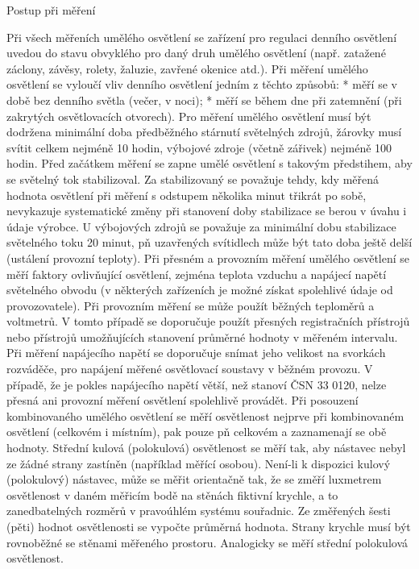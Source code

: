 \sec Postup při měření

Při všech měřeních umělého osvětlení se zařízení pro regulaci denního osvětlení uvedou do stavu obvyklého pro daný druh umělého osvětlení (např. zatažené záclony, závěsy, rolety, žaluzie, zavřené okenice atd.).
Při měření umělého osvětlení se vyloučí vliv denního osvětlení jedním z těchto způsobů:
\medskip
\begitems
    * měří se v době bez denního světla (večer, v noci);
    * měří se během dne při zatemnění (při zakrytých osvětlovacích otvorech).
\enditems
\medskip
Pro měření umělého osvětlení musí být dodržena minimální doba předběžného stárnutí světelných zdrojů, žárovky musí svítit celkem nejméně 10 hodin, výbojové zdroje (včetně zářivek) nejméně 100 hodin.
\medskip
Před začátkem měření se zapne umělé osvětlení s takovým předstihem, aby se světelný tok stabilizoval. Za stabilizovaný se považuje tehdy, kdy měřená hodnota osvětlení při měření s odstupem několika minut třikrát po sobě, nevykazuje systematické změny při stanovení doby stabilizace se berou v úvahu i údaje výrobce. U výbojových zdrojů se považuje za minimální dobu stabilizace světelného toku 20 minut, pň uzavřených svítidlech může být tato doba ještě delší (ustálení provozní teploty).
\medskip
Při přesném a provozním měření umělého osvětlení se měří faktory ovlivňující osvětlení, zejména teplota vzduchu a napájecí napětí světelného obvodu (v některých zařízeních je možné získat spolehlivé údaje od provozovatele). Při provozním měření se může použít běžných teploměrů a voltmetrů. V tomto případě se doporučuje použít přesných registračních přístrojů nebo přístrojů umožňujících stanovení průměrné hodnoty v měřeném intervalu. Při měření napájecího napětí se doporučuje snímat jeho velikost na svorkách rozváděče, pro napájení měřené osvětlovací soustavy v běžném provozu. V případě, že je pokles napájecího napětí větší, než stanoví ČSN 33 0120, nelze přesná ani provozní měření osvětlení spolehlivě provádět.
\medskip
Při posouzení kombinovaného umělého osvětlení se měří osvětlenost nejprve při kombinovaném osvětlení (celkovém i místním), pak pouze pň celkovém a zaznamenají se obě hodnoty.
Střední kulová (polokulová) osvětlenost se měří tak, aby nástavec nebyl ze žádné strany zastíněn (například měřící osobou). Není-li k dispozici kulový (polokulový) nástavec, může se měřit orientačně tak, že se změří luxmetrem osvětlenost v daném měřicím bodě na stěnách fiktivní krychle, a to zanedbatelných rozměrů v pravoúhlém systému souřadnic. Ze změřených šesti (pěti) hodnot osvětlenosti se vypočte průměrná hodnota. Strany krychle musí být rovnoběžné se stěnami měřeného prostoru. Analogicky se měří střední polokulová osvětlenost.

